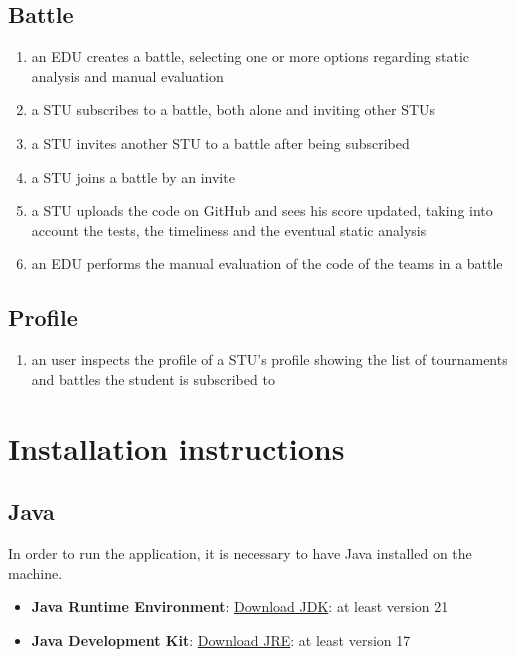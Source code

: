 \section{Battle}

\begin{enumerate}
    \item an EDU creates a battle, selecting one or more options regarding static analysis and manual evaluation
    \item a STU subscribes to a battle, both alone and inviting other STUs
    \item a STU invites another STU to a battle after being subscribed
    \item a STU joins a battle by an invite
    \item a STU uploads the code on GitHub and sees his score updated, taking into account the tests, the timeliness and the eventual static analysis
    \item an EDU performs the manual evaluation of the code of the teams in a battle
\end{enumerate}

\section{Profile}

\begin{enumerate}
    \item an user inspects the profile of a STU's profile showing the list of tournaments and battles the student is subscribed to
\end{enumerate}

\chapter{Installation instructions}

\section{Java}
In order to run the application, it is necessary to have Java installed on the machine.
\begin{itemize}
    \item \textbf{Java Runtime Environment}: \href{https://www.java.com/it/download/manual.jsp}{Download JDK}: at least version 21
    \item \textbf{Java Development Kit}: \href{https://www.oracle.com/java/technologies/downloads/}{Download JRE}: at least version 17
\end{itemize}

